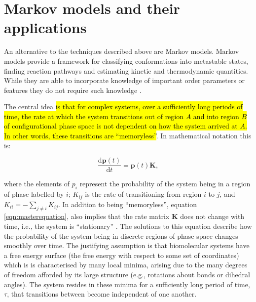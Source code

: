 \section{Markov models and their applications}\label{sec:mm_applications}
An alternative to the techniques described above are Markov models.  Markov models provide a framework for classifying conformations into metastable states, finding reaction pathways and estimating kinetic and thermodynamic quantities. While they are able to incorporate knowledge of important order parameters or features they do not require such knowledge \cite{husicMarkovStateModels2018, pandeEverythingYouWanted2010}.

The central idea \cite{zwanzigClassicalDynamicsContinuous1983a} \hl{is that for complex systems, over a sufficiently long periods of time, the rate at which the system transitions out of region $A$ and into region $B$ of configurational phase space is not dependent on how the system arrived at $A$. In other words, these transitions are ``memoryless''}. In mathematical notation this is\cite{noeTransitionNetworksModeling2008}: 

\begin{equation}\label{eqn:masterequation}
    \frac{\mathrm{d}\mathbf{p}(t)}{\mathrm{d}t} = \mathbf{p}(t)\mathbf{K},
\end{equation}

where the elements of $p_{i}$ represent the probability of the system being in a region of phase labelled by $i$; $K_{ij}$ is the rate of transitioning from region $i$ to $j$, and $K_{ii} = -\sum_{j\ne i} K_{ij}$. In addition to being ``memoryless'', equation \ref{eqn:masterequation}, also implies that the rate matrix $\mathbf{K}$ does not change with time, i.e., the system is ``stationary'' \cite{zwanzigClassicalDynamicsContinuous1983a}.  The solutions to this equation describe how the probability of the system being in discrete regions of phase space changes smoothly over time. The justifying assumption is that biomolecular systems have a free energy surface (the free energy with respect to some set of coordinates) which is is characterised by many local minima, arising due to the many degrees of freedom afforded by its large structure (e.g., rotations about bonds or dihedral angles). The system resides in these minima for a sufficiently long period of time, $\tau$, that transitions between become independent of one another. 

